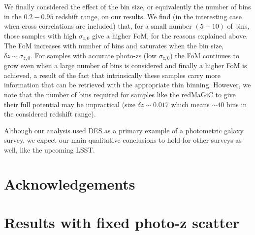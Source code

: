 \documentclass[a4paper,fleqn,usenatbib]{mnras}
\begin{document}
We finally considered the effect  of the bin size, or equivalently the number of bins in the $0.2 - 0.95$ redshift range, on our results. We find (in the interesting case when cross correlations are included) that, for a small number $(5-10)$ of bins, those samples with high $\sigma_{z,0}$ give a higher FoM, for the reasons explained above. The FoM increases with number of bins and saturates when the bin size, $\delta z \sim \sigma_{z,0}$. For samples with accurate photo-zs (low $\sigma_{z,0}$) the FoM continues to grow even when a large number of bins is considered and finally a higher FoM is achieved, a result of the fact that intrinsically these samples carry more information that can be retrieved with the appropriate thin binning. However, we note that the number of bins required for samples like the redMaGiC to give their full potential may be impractical (size $\delta z \sim 0.017$ which means $\sim 40$ bins in the considered redshift range).

Although our analysis used DES as a primary example of a photometric galaxy survey, we expect our main qualitative conclusions to hold for other surveys as well, like the upcoming LSST.


\section*{Acknowledgements}






%


\begin{thebibliography}{99}


\end{thebibliography}


\appendix





\section{Results with fixed photo-z scatter}
\label{sec: shift_and_Gaussian}
\end{document}
